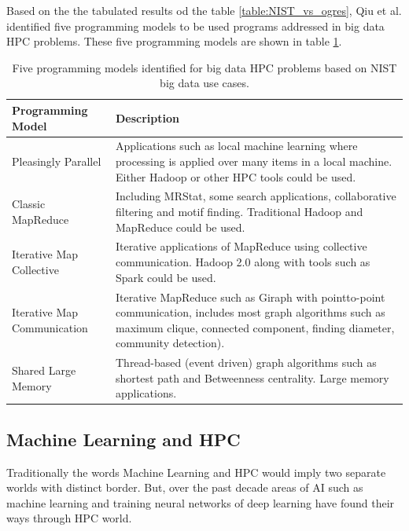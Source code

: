\documentclass[runningheads,a4paper]{llncs}
\begin{document}
Based on the the tabulated results od the table \ref{table:NIST_vs_ogres}, Qiu et al. \cite{Qiu2014} identified five programming models to be used programs addressed in big data HPC problems. These five programming models are shown in table \ref{table:NIST_5_Programming_model}.
\begin{table}
	\centering
	\caption{Five programming models identified for big data HPC problems based on NIST big data use cases.}
	\begin{tabular}{ |p{4cm}|p{7cm}|  }
		\hline
		\textbf{Programming Model} & \textbf{Description} \\
		\hline
		Pleasingly Parallel & Applications such as local machine learning where processing is applied over many items in a local machine. Either Hadoop or other HPC tools could be used. \\
		\hline
		Classic MapReduce & Including MRStat, some search applications, collaborative filtering and motif finding. Traditional Hadoop and MapReduce could be used.\\
		\hline
		Iterative Map Collective & Iterative applications of MapReduce using collective communication. Hadoop 2.0 along with tools such as Spark could be used.\\
		\hline
		Iterative Map Communication & Iterative MapReduce such as Giraph with pointto-point
		communication, includes most graph algorithms
		such as maximum clique, connected
		component, finding diameter, community detection).
		 \\
		\hline
		Shared Large Memory & Thread-based (event driven) graph algorithms
		such as shortest path and Betweenness centrality.
		Large memory applications.\\
		\hline
		
	\end{tabular}
	\label{table:NIST_5_Programming_model}
\end{table}


\newpage
\subsection{Machine Learning and HPC}
Traditionally the words Machine Learning and HPC would imply two separate worlds with distinct border. But, over the past decade areas of AI such as machine learning and training neural networks of deep learning have found their ways through HPC world.\\
\end{document}
